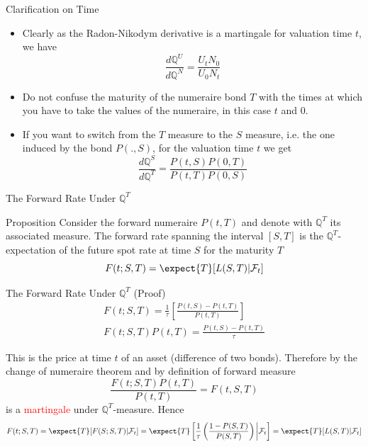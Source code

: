 \documentclass{beamer}
\begin{document}
\begin{frame}{Clarification on Time}
  \begin{itemize}
  \item Clearly as the Radon-Nikodym derivative is a martingale for valuation time $t$, we have
    \begin{equation*}
      \frac{d\mathbb{Q}^U}{d\mathbb{Q}^N}=\frac{U_tN_0}{U_0N_t}
    \end{equation*}
  \item Do not confuse the maturity of the numeraire bond $T$ with the times at which you have to take the values of the numeraire, in this case $t$ and 0.
  \item If you want to switch from the $T$ measure to the $S$ measure, i.e. the one induced by the bond $P(.,S)$, for the valuation time $t$ we get
    \begin{equation*}
      \frac{d\mathbb{Q}^S}{d\mathbb{Q}^T}=\frac{P(t,S)P(0,T)}{P(t,T)P(0,S)}
    \end{equation*}
  \end{itemize}
\end{frame}

\begin{frame}{The Forward Rate Under $\mathbb{Q}^T$}
  \begin{block}{Proposition}
    Consider the forward numeraire $P(t,T)$ and denote with $\mathbb{Q}^T$ its associated measure.
    The forward rate spanning the interval $[S,T]$ is the $\mathbb{Q}^T$-expectation of the future spot rate at time $S$ for the maturity $T$
    \begin{equation}
      F(t;S,T) =\expect{T}[L(S,T)|\mathcal{F}_t]
    \end{equation}
  \end{block}
\end{frame}

\begin{frame}{The Forward Rate Under $\mathbb{Q}^T$ (Proof)}
  \begin{equation*}
    \begin{gathered}
      F(t;S,T) = \frac{1}{\tau}\left[\frac{P(t,S)-P(t,T)}{P(t,T)}\right] \\[0.3cm]
      F(t;S,T)P(t,T) = \frac{P(t,S)-P(t,T)}{\tau}
    \end{gathered}
  \end{equation*}

  This is the price at time $t$ of an asset (difference of two bonds). Therefore by the change of numeraire theorem and by definition of forward measure
  \begin{equation*}
    \frac{F(t;S,T)P(t,T)}{P(t,T)} = F(t,S,T)
  \end{equation*}
  is a \textcolor{red}{martingale} under $\mathbb{Q}^T$-measure. \pause Hence
  \begin{equation*}
    F(t;S,T) = \expect{T}[F(S;S,T)|\mathcal{F}_t] = \expect{T}\left[\frac{1}{\tau}\left(\frac{1-P(S,T)}{P(S,T)}\right)\bigg|\mathcal{F}_t\right] = \expect{T}[L(S,T)|\mathcal{F}_t]
  \end{equation*}
\end{frame}
\end{document}
